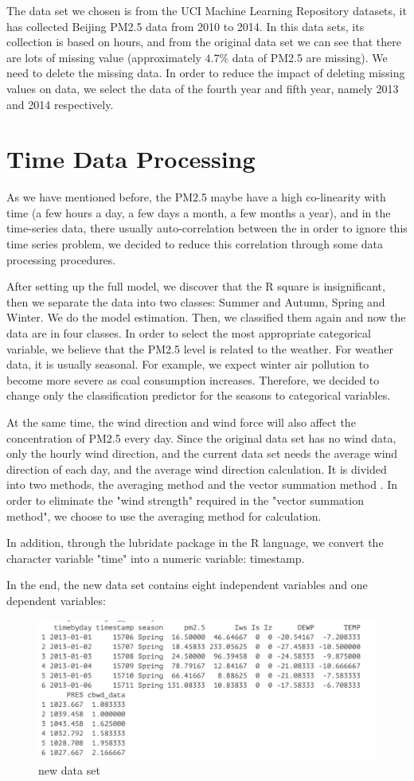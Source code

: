 The data set we chosen is from the UCI Machine Learning Repository datasets, it has collected Beijing PM2.5 data from 2010 to 2014. In this data sets, its collection is based on hours, and from the original data set we can see that there are lots of missing value (approximately $4.7\%$ data of PM2.5 are missing). We need to delete the missing data. In order to reduce the impact of deleting missing values on data, we select the data of the fourth year and fifth year, namely 2013 and 2014 respectively.


\section{Time Data Processing}
As we have mentioned before, the PM2.5 maybe have a high co-linearity with time (a few hours a day, a few days a month, a few months a year), and in the time-series data, there usually auto-correlation between the  in order to ignore this time series problem, we decided to reduce this correlation through some data processing procedures.

After setting up the full model, we discover that the R square is insignificant, then we separate the data into two classes: Summer and Autumn, Spring and Winter. We do the model estimation. Then, we classified them again and now the data are in four classes. In order to select the most appropriate categorical variable, we believe that the PM2.5 level is related to the weather. For weather data, it is usually seasonal. For example, we expect winter air pollution to become more severe as coal consumption increases. Therefore, we decided to change only the classification predictor for the seasons to categorical variables.

At the same time, the wind direction and wind force will also affect the concentration of PM2.5 every day. Since the original data set has no wind data, only the hourly wind direction, and the current data set needs the average wind direction of each day, and the average wind direction calculation. It is divided into two methods, the averaging method and the vector summation method \citep{yueh1997modeling}. In order to eliminate the "wind strength" required in the "vector summation method", we choose to use the averaging method for calculation.

In addition, through the lubridate package in the R language, we convert the character variable "time" into a numeric variable: timestamp.

In the end, the new data set contains eight independent variables and one dependent variables:

\begin{figure}[h!]
\centering
\includegraphics[width=1.0\textwidth]{Figures/newdata.png}
\caption[Figures/newdata.png]{new data set}
\label{fig:new data set}
\end{figure}
